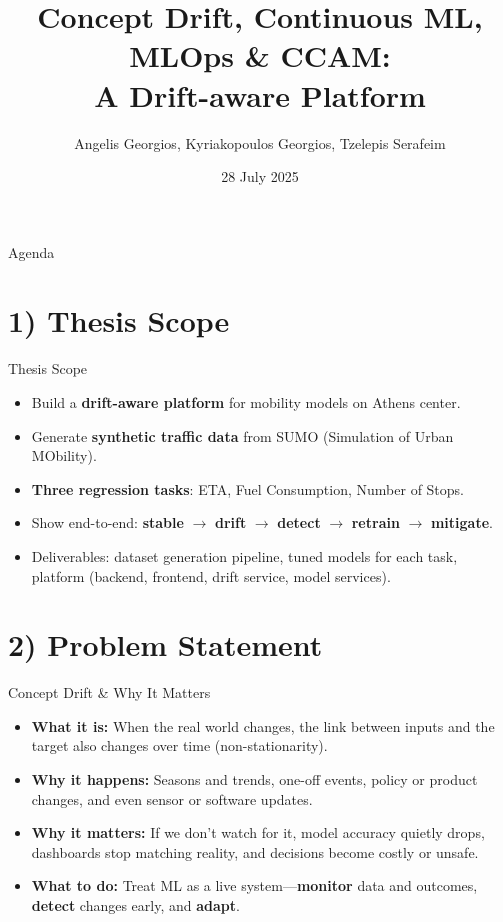 \documentclass[aspectratio=169]{beamer}
\title{Concept Drift, Continuous ML, MLOps \& CCAM:\\
A Drift-aware Platform}
\author{Angelis Georgios, Kyriakopoulos Georgios, Tzelepis Serafeim}
\institute{School of Electrical and Computer Engineering, National Technical University of Athens}
\date{28 July 2025}
\begin{document}
\begin{frame}
    \titlepage
\end{frame}

\begin{frame}{Agenda}
    \tableofcontents
\end{frame}

\section{1) Thesis Scope}
\begin{frame}{Thesis Scope}
\begin{itemize}
    \item Build a \textbf{drift-aware platform} for mobility models on Athens center.
    \item Generate \textbf{synthetic traffic data} from SUMO (Simulation of Urban MObility).
    \item \textbf{Three regression tasks}: ETA, Fuel Consumption, Number of Stops.
    \item Show end-to-end: \textbf{stable} $\rightarrow$ \textbf{drift} $\rightarrow$ \textbf{detect} $\rightarrow$ \textbf{retrain} $\rightarrow$ \textbf{mitigate}.
    \item Deliverables: dataset generation pipeline, tuned models for each task, platform (backend, frontend, drift service, model services).
\end{itemize}
\end{frame}

\section{2) Problem Statement}
\begin{frame}{Concept Drift \& Why It Matters}
\begin{itemize}
\item \textbf{What it is:} When the real world changes, the link between inputs and the target also changes over time (non-stationarity).
\item \textbf{Why it happens:} Seasons and trends, one-off events, policy or product changes, and even sensor or software updates.
\item \textbf{Why it matters:} If we don't watch for it, model accuracy quietly drops, dashboards stop matching reality, and decisions become costly or unsafe.
\item \textbf{What to do:} Treat ML as a live system—\textbf{monitor} data and outcomes, \textbf{detect} changes early, and \textbf{adapt}.
\end{itemize}
\end{frame}
\end{document}

